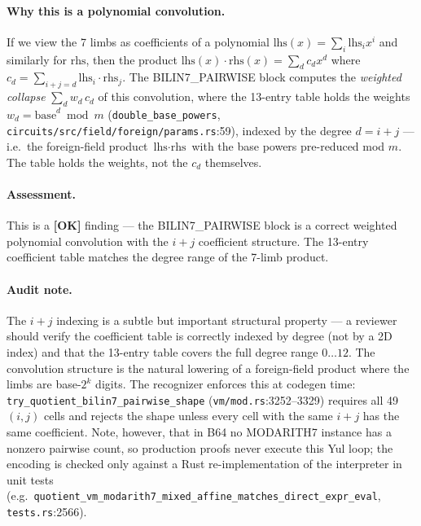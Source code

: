 \paragraph{Why this is a polynomial convolution.} If we view the
7 limbs as coefficients of a polynomial
$\text{lhs}(x) = \sum_i \text{lhs}_i x^i$ and similarly for
$\text{rhs}$, then the product
$\text{lhs}(x) \cdot \text{rhs}(x) = \sum_{d} c_d x^d$ where
$c_d = \sum_{i+j=d} \text{lhs}_i \cdot \text{rhs}_j$. The
BILIN7\_PAIRWISE block computes the \emph{weighted collapse}
$\sum_{d} w_d\,c_d$ of this convolution, where the 13-entry
table holds the weights $w_d = \text{base}^{d} \bmod m$
(\texttt{double\_\allowbreak{}base\_\allowbreak{}powers}, \texttt{circuits/\allowbreak{}src/\allowbreak{}field/\allowbreak{}foreign/\allowbreak{}params.rs}:59),
indexed by the degree $d = i + j$ --- i.e.\ the foreign-field
product $\text{lhs}\cdot\text{rhs}$ with the base powers
pre-reduced mod $m$. The table holds the weights, not the $c_d$
themselves.

\paragraph{Assessment.} This is a
\textcolor{tracegreen}{\textbf{[OK]}} finding --- the
BILIN7\_PAIRWISE block is a correct weighted polynomial
convolution with the $i{+}j$ coefficient structure. The 13-entry coefficient table
matches the degree range of the 7-limb product.

\paragraph{Audit note.} The $i{+}j$ indexing is a subtle but
important structural property --- a reviewer should verify the
coefficient table is correctly indexed by degree (not by a 2D
index) and that the 13-entry table covers the full degree range
$0 \dots 12$. The convolution structure is the natural lowering
of a foreign-field product where the limbs are base-$2^k$ digits.
 The recognizer enforces this at codegen time:
\texttt{try\_\allowbreak{}quotient\_\allowbreak{}bilin7\_\allowbreak{}pairwise\_\allowbreak{}shape}
(\texttt{vm/mod.rs}:3252--3329) requires all 49 $(i,j)$ cells and
rejects the shape unless every cell with the same $i{+}j$ has the
same coefficient. Note, however, that in B64 no MODARITH7 instance
has a nonzero pairwise count, so production proofs never execute
this Yul loop; the encoding is checked only against a Rust
re-implementation of the interpreter in unit tests (e.g.\
\texttt{quotient\_\allowbreak{}vm\_\allowbreak{}modarith7\_\allowbreak{}mixed\_\allowbreak{}affine\_\allowbreak{}matches\_\allowbreak{}direct\_\allowbreak{}expr\_\allowbreak{}eval},
\texttt{tests.rs}:2566).

